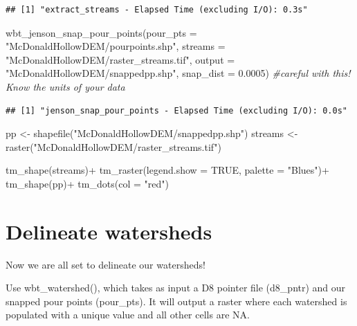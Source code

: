 \documentclass[
]{book}
\newenvironment{Shaded}{\begin{snugshade}}{\end{snugshade}}
\newcommand{\AttributeTok}[1]{\textcolor[rgb]{0.77,0.63,0.00}{#1}}
\newcommand{\CommentTok}[1]{\textcolor[rgb]{0.56,0.35,0.01}{\textit{#1}}}
\newcommand{\ConstantTok}[1]{\textcolor[rgb]{0.00,0.00,0.00}{#1}}
\newcommand{\FloatTok}[1]{\textcolor[rgb]{0.00,0.00,0.81}{#1}}
\newcommand{\FunctionTok}[1]{\textcolor[rgb]{0.00,0.00,0.00}{#1}}
\newcommand{\NormalTok}[1]{#1}
\newcommand{\OtherTok}[1]{\textcolor[rgb]{0.56,0.35,0.01}{#1}}
\newcommand{\SpecialCharTok}[1]{\textcolor[rgb]{0.00,0.00,0.00}{#1}}
\newcommand{\StringTok}[1]{\textcolor[rgb]{0.31,0.60,0.02}{#1}}
\begin{document}
\begin{verbatim}
## [1] "extract_streams - Elapsed Time (excluding I/O): 0.3s"
\end{verbatim}

\begin{Shaded}
\begin{Highlighting}[]
\FunctionTok{wbt\_jenson\_snap\_pour\_points}\NormalTok{(}\AttributeTok{pour\_pts =} \StringTok{"McDonaldHollowDEM/pourpoints.shp"}\NormalTok{,}
                            \AttributeTok{streams =} \StringTok{"McDonaldHollowDEM/raster\_streams.tif"}\NormalTok{,}
                            \AttributeTok{output =} \StringTok{"McDonaldHollowDEM/snappedpp.shp"}\NormalTok{,}
                            \AttributeTok{snap\_dist =} \FloatTok{0.0005}\NormalTok{) }\CommentTok{\#careful with this! Know the units of your data}
\end{Highlighting}
\end{Shaded}

\begin{verbatim}
## [1] "jenson_snap_pour_points - Elapsed Time (excluding I/O): 0.0s"
\end{verbatim}

\begin{Shaded}
\begin{Highlighting}[]
\NormalTok{pp }\OtherTok{\textless{}{-}} \FunctionTok{shapefile}\NormalTok{(}\StringTok{"McDonaldHollowDEM/snappedpp.shp"}\NormalTok{)}
\NormalTok{streams }\OtherTok{\textless{}{-}} \FunctionTok{raster}\NormalTok{(}\StringTok{"McDonaldHollowDEM/raster\_streams.tif"}\NormalTok{)}

\FunctionTok{tm\_shape}\NormalTok{(streams)}\SpecialCharTok{+}
  \FunctionTok{tm\_raster}\NormalTok{(}\AttributeTok{legend.show =} \ConstantTok{TRUE}\NormalTok{, }\AttributeTok{palette =} \StringTok{"Blues"}\NormalTok{)}\SpecialCharTok{+}
\FunctionTok{tm\_shape}\NormalTok{(pp)}\SpecialCharTok{+}
  \FunctionTok{tm\_dots}\NormalTok{(}\AttributeTok{col =} \StringTok{"red"}\NormalTok{)}
\end{Highlighting}
\end{Shaded}

\hypertarget{delineate-watersheds}{%
\section{Delineate watersheds}\label{delineate-watersheds}}

Now we are all set to delineate our watersheds!

Use wbt\_watershed(), which takes as input a D8 pointer file (d8\_pntr) and our snapped pour points (pour\_pts). It will output a raster where each watershed is populated with a unique value and all other cells are NA.
\end{document}
